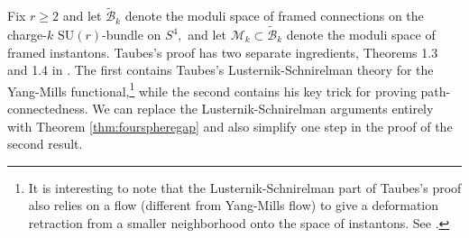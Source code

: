 \documentclass[12pt]{amsart}
\newcommand{\YM}{\mathcal{YM}}
\newcommand{\LB}{\left[}
\newcommand{\RB}{\right]}
\renewcommand{\1}{{\mathbf 1}}
\newcommand{\calB}{\mathcal{B}}
\newcommand{\SU}{{\mathrm{SU} }}
\newcommand{\calM}{\mathcal{M}}
\newtheorem{thm}{Theorem}[section]
\theoremstyle{others}
\numberwithin{equation}{section}
\begin{document}
Fix $r \geq 2$ and let $\tilde{\mathcal{B}}_k$ denote the moduli space of framed connections on the charge-$k$ $\SU(r)$-bundle on $S^4,$ and let $\calM_k \subset \tilde{\calB}_k$ denote the moduli space of framed instantons. Taubes's proof has two separate ingredients, Theorems 1.3 and 1.4 in \cite{taubespathconnected}. The first contains Taubes's Lusternik-Schnirelman theory for the Yang-Mills functional,\footnote{It is interesting to note that the Lusternik-Schnirelman part of Taubes's proof also relies on a flow (different from Yang-Mills flow) to give a deformation retraction from a smaller neighborhood onto the space of instantons. See \cite[Proposition 3.1]{taubespathconnected}.} while the second contains his key trick for proving path-connectedness. %
We can replace %
the Lusternik-Schnirelman arguments entirely with Theorem \ref{thm:fourspheregap} and also simplify one step in the proof of the second result. %

\end{document}
